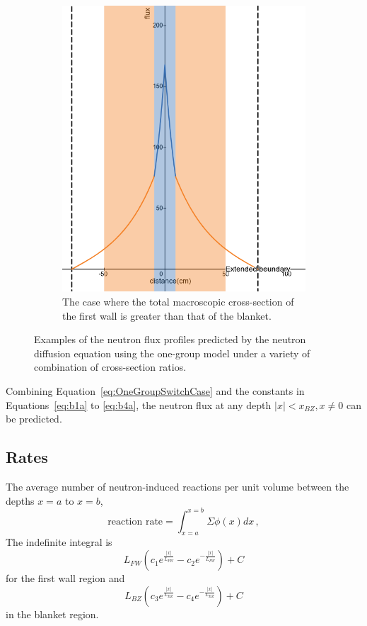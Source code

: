 \documentclass[a4paper, 12pt]{article}
\newcommand{\LFW}[0]{L_{FW}}
\newcommand{\xBZ}[0]{x_{BZ}}
\newcommand{\LBZ}[0]{L_{BZ}}
\begin{document}
\begin{figure}
\begin{subfigure}[b]{0.4\textwidth}
    \includegraphics[width=\textwidth]{OneGroupFluxFWAbs.png}
    \caption{The case where the total macroscopic cross-section of the first wall is greater than that of the blanket.}
    \label{fig:OneGroupFluxFWAbs}
  \end{subfigure}
  \caption{Examples of the neutron flux profiles predicted by the neutron diffusion equation using the one-group model under a variety of combination of cross-section ratios.}\label{fig:OneGroupFlux}
\end{figure}

Combining Equation~\ref{eq:OneGroupSwitchCase} and the constants in Equations~\ref{eq:b1a} to \ref{eq:b4a}, the neutron flux at any depth $|x|<\xBZ, x\neq 0$ can be predicted.

\subsection{Rates}
The average number of neutron-induced reactions per unit volume between the depths $x=a$ to $x=b$,
\begin{equation}
    \text{reaction rate} = \int_{x=a}^{x=b}\Sigma\phi(x)dx\,,
\end{equation}
The indefinite integral is 
\begin{equation}
\LFW (c_1 e^{\frac{|x|}{L_{FW}}} - c_2 e^{-\frac{|x|}{L_{FW}}})+C
\end{equation}
 for the first wall region and 
\begin{equation}
\LBZ (c_3 e^{\frac{|x|}{L_{BZ}}} - c_4 e^{-\frac{|x|}{L_{BZ}}})+C
\end{equation}
  in the blanket region.
\end{document}
